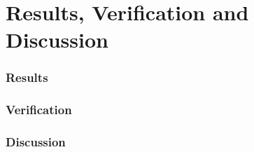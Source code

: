\chapter{Results, Verification and Discussion}





\subsection{Results}





\subsection{Verification}





\subsection{Discussion}





